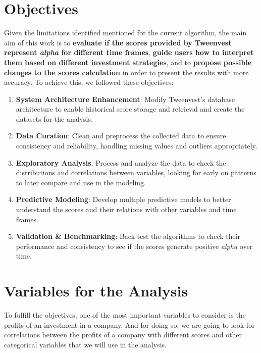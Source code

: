 \documentclass[11pt,english,a4paper,hidelinks]{book}
\begin{document}
\section{Objectives}

\noindent Given the limitations identified mentioned for the current algorithm, the main aim of this work is to \textbf{evaluate if the scores provided by Tweenvest represent \textit{alpha} for different time frames}, \textbf{guide users how to interpret them based on different investment strategies}, and to \textbf{propose possible changes to the scores calculation} in order to present the results with more accuracy. To achieve this, we followed these objectives:

\begin{enumerate}
  \item \textbf{System Architecture Enhancement}: Modify Tweenvest's database architecture to enable historical score storage and retrieval and create the datasets for the analysis.
  \item \textbf{Data Curation}: Clean and preprocess the collected data to ensure consistency and reliability, handling missing values and outliers appropriately.
  \item \textbf{Exploratory Analysis}: Process and analyze the data to check the distributions and correlations between variables, looking for early on patterns to later compare and use in the modeling.
  \item \textbf{Predictive Modeling}: Develop multiple predictive models to better understand the scores and their relations with other variables and time frames.
  \item \textbf{Validation \& Benchmarking}: Back-test the algorithms to check their performance and consistency to see if the scores generate positive \textit{alpha} over time.
\end{enumerate}

\section{Variables for the Analysis}

To fulfill the objectives, one of the most important variables to consider is the profits of an investment in a company. And for doing so, we are going to look for correlations between the profits of a company with different scores and other categorical variables that we will use in the analysis.
\end{document}
